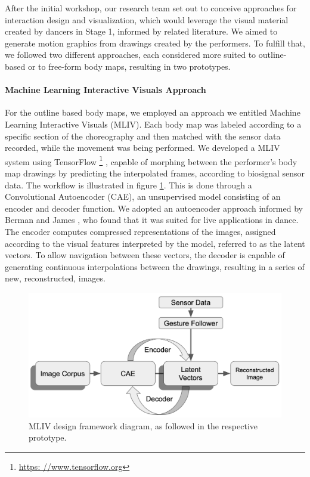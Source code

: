 After the initial workshop, our research team set out to conceive approaches for interaction design and visualization, which would leverage the visual material created by dancers in Stage 1, informed by related literature. We aimed to generate motion graphics from drawings created by the performers. To fulfill that, we followed two different approaches, each considered more suited to outline-based or to free-form body maps, resulting in two prototypes.

\paragraph{Machine Learning Interactive Visuals Approach}

For the outline based body maps, we employed an approach we entitled Machine Learning Interactive Visuals (MLIV). Each body map was labeled according to a specific section of the choreography and then matched with the sensor data recorded, while the movement was being performed. We developed a MLIV system using TensorFlow \footnote{\url{https: //www.tensorflow.org}} \cite{abadi_tensorflow_2016}, capable of morphing between the performer’s body map drawings by predicting the interpolated frames, according to biosignal sensor data. The workflow is illustrated in figure \ref{fig:ml-model}. This is done through a Convolutional Autoencoder (CAE), an unsupervised model consisting of an encoder and decoder function. We adopted an autoencoder approach informed by Berman and James \cite{liapis_learning_2018}, who found that it was suited for live applications in dance. The encoder computes compressed representations of the images, assigned according to the visual features interpreted by the model, referred to as the latent vectors. To allow navigation between these vectors, the decoder is capable of generating continuous interpolations between the drawings, resulting in a series of new, reconstructed, images.

\begin{figure}[ht]
  \centering
  \includegraphics[width=0.9\linewidth]{Chapters/Figures/modi_dis/ml-model.png}
  \caption{MLIV design framework diagram, as followed in the respective prototype.}
    \label{fig:ml-model}
\end{figure}

